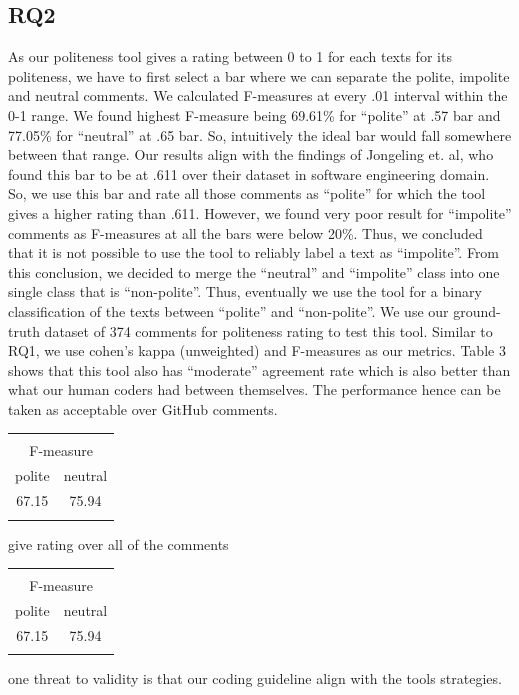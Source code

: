 \subsection{RQ2}

As our politeness tool gives a rating between 0 to 1 for each texts for its politeness, we have to first select a bar where we can separate the polite, impolite and neutral comments.
We calculated F-measures at every .01 interval within the 0-1 range. We found highest F-measure being 69.61\%  for “polite” at .57 bar and 77.05\% for “neutral” at .65 bar. So, intuitively the ideal bar would fall somewhere between that range. Our results align with the findings of Jongeling et. al, who found this bar to be at .611 over their dataset in software engineering domain. So, we use this bar and rate all those comments as “polite” for which the tool gives a higher rating than .611.
However, we found very poor result for “impolite” comments as F-measures at all the bars were below 20\%. Thus, we concluded that it is not possible to use the tool to reliably label a text as “impolite”.
From this conclusion, we decided to merge the “neutral” and “impolite” class into one single class that is “non-polite”. Thus, eventually we use the tool for a binary classification of the texts between “polite” and “non-polite”.
We use our ground-truth dataset of 374 comments for politeness rating to test this tool. Similar to RQ1, we use cohen’s kappa (unweighted) and F-measures as our metrics.
Table 3 shows that this tool also has “moderate” agreement rate which is also better than what our human coders had between themselves. The performance hence can be taken as acceptable over GitHub comments.

\begin{tabular}{cc}
& \\
\multicolumn{2}{c}{ F-measure } \\
polite & neutral \\
67.15 & 75.94 \\
& \\
\end{tabular}

give rating over all of the comments 

\begin{tabular}{cc}
& \\
\multicolumn{2}{c}{ F-measure } \\
polite & neutral \\
67.15 & 75.94 \\
& \\
\end{tabular}
one threat to validity is that our coding guideline align with the tools strategies. 
